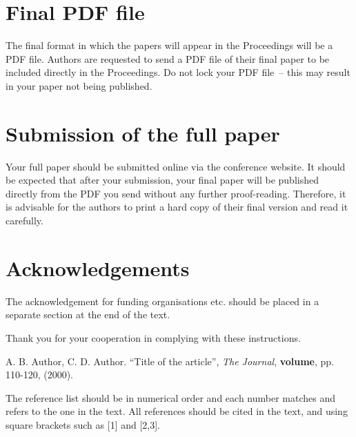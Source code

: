 \documentclass{IETpaper}
\begin{document}
\section{Final PDF file}%

The final format in which the papers will appear in the Proceedings will be 
a PDF file. Authors are requested to send a PDF file of their final paper to 
be included directly in the Proceedings. Do not lock your PDF file~-- this 
may result in your paper not being published. 

\section{Submission of the full paper}%

Your full paper should be submitted online via the conference website. It 
should be expected that after your submission, your final paper will be 
published directly from the PDF you send without any further proof-reading. 
Therefore, it is advisable for the authors to print a hard copy of their 
final version and read it carefully.

\section*{Acknowledgements}

The acknowledgement for funding organisations etc. should be placed in a 
separate section at the end of the text.

Thank you for your cooperation in complying with these instructions.

\vfill\pagebreak

\begin{thebibliography}{0}
\bibitem{}%
A. B. Author, C. D. Author. ``Title of the article'', {\it The Journal}, {\bf volume}, pp. 110-120, (2000).
\end{thebibliography}

The reference list should be in numerical order and each number matches and 
refers to the one in the text. All references should be cited in the text, 
and using square brackets such as [1] and [2,3].
\end{document}
